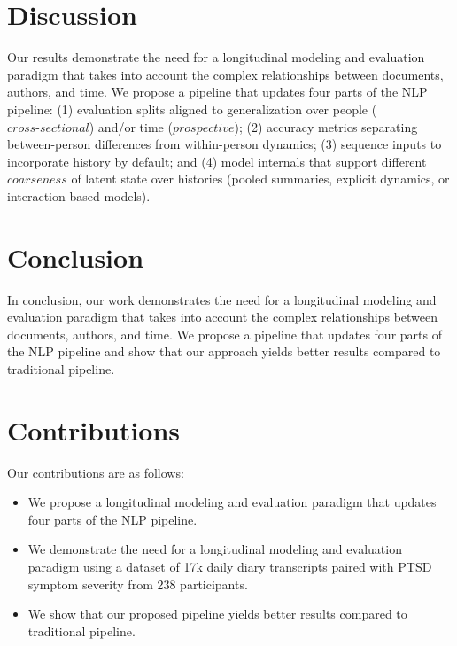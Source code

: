 \documentclass[12pt]{article}
\begin{document}
\section{Discussion}
\label{sec:discussion}
Our results demonstrate the need for a longitudinal modeling and evaluation paradigm that takes into account the complex relationships between documents, authors, and time. We propose a pipeline that updates four parts of the NLP pipeline: (1) evaluation splits aligned to generalization over people ($\textit{cross-sectional}$) and/or time ($\textit{prospective}$); (2) accuracy metrics separating between-person differences from within-person dynamics; (3) sequence inputs to incorporate history by default; and (4) model internals that support different $\textit{coarseness}$ of latent state over histories (pooled summaries, explicit dynamics, or interaction-based models).

\section{Conclusion}
\label{sec:conclusion}
In conclusion, our work demonstrates the need for a longitudinal modeling and evaluation paradigm that takes into account the complex relationships between documents, authors, and time. We propose a pipeline that updates four parts of the NLP pipeline and show that our approach yields better results compared to traditional pipeline.

\section{Contributions}
\label{sec:contributions}
Our contributions are as follows:

\begin{itemize}
\item We propose a longitudinal modeling and evaluation paradigm that updates four parts of the NLP pipeline.
\item We demonstrate the need for a longitudinal modeling and evaluation paradigm using a dataset of 17k daily diary transcripts paired with PTSD symptom severity from 238 participants.
\item We show that our proposed pipeline yields better results compared to traditional pipeline.
\end{itemize}
\end{document}
